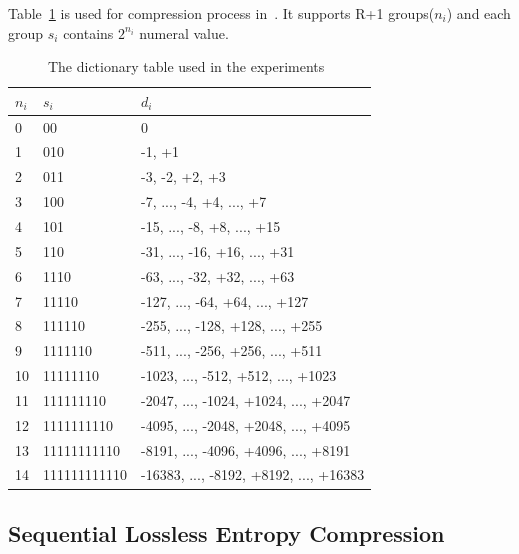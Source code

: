 Table~\ref{table:LEC} is used for compression process in~\cite{marcelloni2008simple, marcelloni2009efficient}. It
supports R+1 groups($n_i$) and each group $s_i$ contains $2^{n_i}$ numeral
value.
\begin{table}[]
\begin{tabular}{|l|l|l|}
\hline
$n_i$ & $s_i$        & $d_i$                                  \\ \hline
0     & 00           & 0                                      \\ 
1     & 010          & -1, +1                                 \\
2     & 011          & -3, -2, +2, +3                         \\
3     & 100          & -7, ..., -4, +4, ..., +7               \\
4     & 101          & -15, ..., -8, +8, ..., +15             \\
5     & 110          & -31, ..., -16, +16, ..., +31           \\
6     & 1110         & -63, ..., -32, +32, ..., +63           \\
7     & 11110        & -127, ..., -64, +64, ..., +127         \\
8     & 111110       & -255, ..., -128, +128, ..., +255       \\
9     & 1111110      & -511, ..., -256, +256, ..., +511       \\
10    & 11111110     & -1023, ..., -512, +512, ..., +1023     \\
11    & 111111110    & -2047, ..., -1024, +1024, ..., +2047   \\
12    & 1111111110   & -4095, ..., -2048, +2048, ..., +4095   \\
13    & 11111111110  & -8191, ..., -4096, +4096, ..., +8191   \\
14    & 111111111110 & -16383, ..., -8192, +8192, ..., +16383 \\
\hline
\end{tabular}
\caption{The dictionary table used in the experiments~\cite{marcelloni2009efficient}}
\label{table:LEC}
\end{table}
 
\subsection{Sequential Lossless Entropy Compression}

